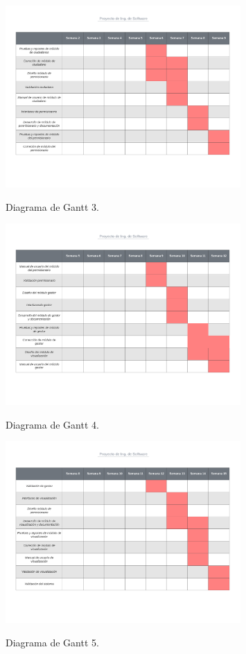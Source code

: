 \documentclass[12pt,twoside]{article}
\begin{document}
\begin{figure}[!htb]
    \centering
    \includegraphics[width=0.8\textwidth]{images/gantt3.png}
    \label{gantt3}
    \caption{Diagrama de Gantt 3.}
\end{figure}

\begin{figure}[!htb]
    \centering
    \includegraphics[width=0.8\textwidth]{images/gantt4.png}
    \label{gantt4}
    \caption{Diagrama de Gantt 4.}
\end{figure}

\begin{figure}[!htb]
    \centering
    \includegraphics[width=0.8\textwidth]{images/gantt5.png}
    \label{gantt5}
    \caption{Diagrama de Gantt 5.}
\end{figure}
\clearpage
\end{document}
